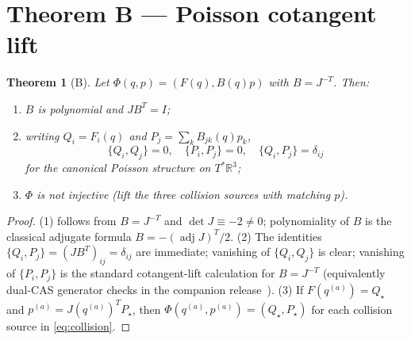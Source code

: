 ﻿\documentclass[11pt]{article}
\newtheorem{theorem}{Theorem}
\begin{document}
\section{Theorem B --- Poisson cotangent lift}
\begin{theorem}[B]
Let \(\Phi(q,p)=(F(q),B(q)p)\) with \(B=J^{-T}\). Then:
\begin{enumerate}
\item \(B\) is polynomial and \(JB^{T}=I\);
\item writing \(Q_i=F_i(q)\) and \(P_j=\sum_k B_{jk}(q)p_k\),
\[
\{Q_i,Q_j\}=0,\quad
\{P_i,P_j\}=0,\quad
\{Q_i,P_j\}=\delta_{ij}
\]
for the canonical Poisson structure on \(T^*\mathbb{R}^3\);
\item \(\Phi\) is not injective (lift the three collision sources with matching \(p\)).
\end{enumerate}
\end{theorem}
\begin{proof}
(1) follows from \(B=J^{-T}\) and \(\det J\equiv-2\neq 0\); polynomiality of \(B\) is the classical adjugate formula \(B=-(\operatorname{adj} J)^{T}/2\).
(2) The identities \(\{Q_i,P_j\}=(JB^{T})_{ij}=\delta_{ij}\) are immediate; vanishing of \(\{Q_i,Q_j\}\) is clear; vanishing of \(\{P_i,P_j\}\) is the standard cotangent-lift calculation for \(B=J^{-T}\) (equivalently dual-CAS generator checks in the companion release~\cite{FredriksenSoft}).
(3) If \(F(q^{(a)})=Q_\star\) and \(p^{(a)}=J(q^{(a)})^{T}P_\star\), then \(\Phi(q^{(a)},p^{(a)})=(Q_\star,P_\star)\) for each collision source in \eqref{eq:collision}.
\end{proof}
\end{document}
